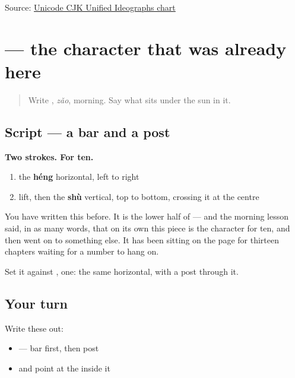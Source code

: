\begin{tcolorbox}[breakable,colback=teal!4,colframe=teal!35!black,title={Before you move on}]
Source: \href{https://www.unicode.org/charts/PDF/U4E00.pdf}{Unicode CJK Unified Ideographs chart}
\end{tcolorbox}
\section[\texorpdfstring{\zh{十} (shí)}{十 (shí)}]{ — the character that was already here}

\label{lesson:ZH-W20-shi}



\begin{quote}
Write , \emph{zǎo}, morning. Say what sits under the sun in it.
\end{quote}

\subsection*{Script — a bar and a post}

\begin{quote}
\end{quote}

\textbf{Two strokes. For ten.}

\begin{enumerate}
\raggedright
  \item the \textbf{héng} horizontal, left to right
  \item lift, then the \textbf{shù} vertical, top to bottom, crossing it at the centre
\end{enumerate}

You have written this before. It is the lower half of \textbf{} — and the morning lesson said, in as many words, that on its own this piece is the character for ten, and then went on to something else. It has been sitting on the page for thirteen chapters waiting for a number to hang on.

Set it against \textbf{}, one: the same horizontal, with a post through it.

\subsection*{Your turn}
Write these out:

\begin{itemize}
\raggedright
  \item {} — bar first, then post
  \item {} and point at the  inside it
\end{itemize}

